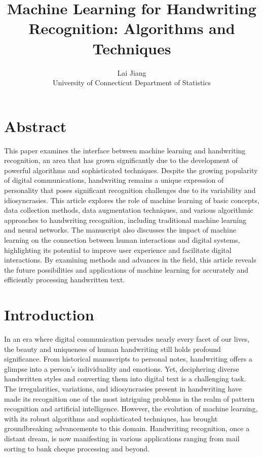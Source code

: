 \documentclass[12pt]{article}
\title{Machine Learning for Handwriting Recognition: Algorithms and Techniques}
\author{Lai Jiang\\
  University of Connecticut Department of Statistics
}
\begin{document}
\maketitle

\section* {Abstract}
This paper examines the interface between machine learning and handwriting recognition, an area that has grown significantly due to the development of powerful algorithms and sophisticated techniques. Despite the growing popularity of digital communications, handwriting remains a unique expression of personality that poses significant recognition challenges due to its variability and idiosyncrasies. This article explores the role of machine learning of basic concepts, data collection methods, data augmentation techniques, and various algorithmic approaches to handwriting recognition, including traditional machine learning and neural networks. The manuscript also discusses the impact of machine learning on the connection between human interactions and digital systems, highlighting its potential to improve user experience and facilitate digital interactions. By examining methods and advances in the field, this article reveals the future possibilities and applications of machine learning for accurately and efficiently processing handwritten text.


\section* {Introduction}
In an era where digital communication pervades nearly every facet of our lives, the beauty and uniqueness of human handwriting still holds profound significance. From historical manuscripts to personal notes, handwriting offers a glimpse into a person's individuality and emotions. Yet, deciphering diverse handwritten styles and converting them into digital text is a challenging task. The irregularities, variations, and idiosyncrasies present in handwriting have made its recognition one of the most intriguing problems in the realm of pattern recognition and artificial intelligence. However, the evolution of machine learning, with its robust algorithms and sophisticated techniques, has brought groundbreaking advancements to this domain. Handwriting recognition, once a distant dream, is now manifesting in various applications ranging from mail sorting to bank cheque processing and beyond. 
\end{document}
